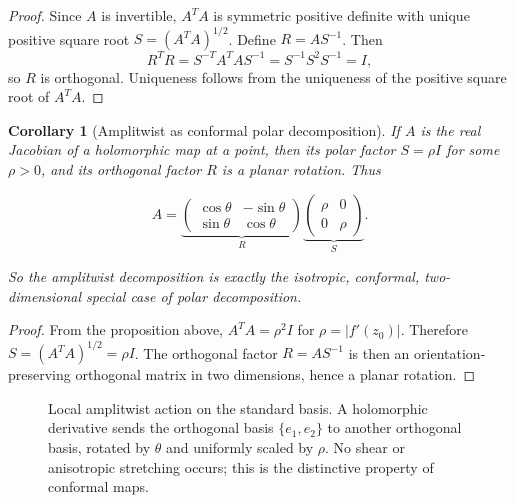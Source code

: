 \documentclass[11pt, a4paper]{article}
\theoremstyle{plain}
\newtheorem{corollary}[theorem]{Corollary}
\theoremstyle{definition}
\theoremstyle{remark}
\begin{document}
\begin{proof}
Since $A$ is invertible, $A^T A$ is symmetric positive definite with unique positive
square root $S=(A^T A)^{1/2}$. Define $R=A S^{-1}$. Then
\[
R^T R = S^{-T}A^T A S^{-1} = S^{-1}S^2 S^{-1} = I,
\]
so $R$ is orthogonal. Uniqueness follows from the uniqueness of the positive square
root of $A^T A$.
\end{proof}

\begin{corollary}[Amplitwist as conformal polar decomposition]
If $A$ is the real Jacobian of a holomorphic map at a point, then its polar factor
$S=\rho I$ for some $\rho>0$, and its orthogonal factor $R$ is a planar rotation. Thus

\begin{equation}
A
=
\underbrace{
\begin{pmatrix}
\cos\theta & -\sin\theta\\
\sin\theta & \cos\theta
\end{pmatrix}}_{R}
\underbrace{
\begin{pmatrix}
\rho & 0\\
0 & \rho
\end{pmatrix}}_{S}.
\end{equation}

So the amplitwist decomposition is exactly the isotropic, conformal, two-dimensional
special case of polar decomposition.
\end{corollary}

\begin{proof}
From the proposition above, $A^T A=\rho^2 I$ for $\rho=|f'(z_0)|$.
Therefore $S=(A^T A)^{1/2}=\rho I$.
The orthogonal factor $R=A S^{-1}$ is then an orientation-preserving orthogonal matrix
in two dimensions, hence a planar rotation.
\end{proof}

\begin{figure}[h]
\centering
{}
\caption{Local amplitwist action on the standard basis. A holomorphic derivative sends
the orthogonal basis $\{e_1,e_2\}$ to another orthogonal basis, rotated by $\theta$ and
uniformly scaled by $\rho$. No shear or anisotropic stretching occurs; this is the
distinctive property of conformal maps.}
\end{figure}
\end{document}
